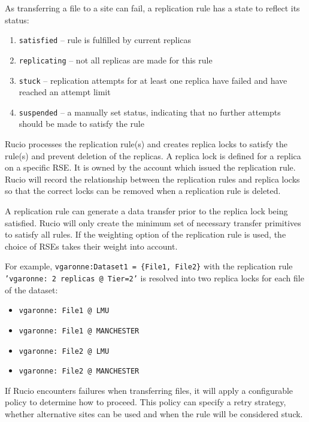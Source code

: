 \documentclass{atlasnote}
\begin{document}
As transferring a file to a site can fail, a replication rule has a state to reflect its status:

\begin{enumerate}
\item[] \texttt{satisfied} -- rule is fulfilled by current replicas
\item[] \texttt{replicating} -- not all replicas are made for this rule
\item[] \texttt{stuck} -- replication attempts for at least one replica have failed and have reached an attempt limit
\item[] \texttt{suspended} -- a manually set status, indicating that no further attempts should be made to satisfy the rule
\end{enumerate}

Rucio processes the replication rule(s) and creates replica locks to satisfy the rule(s) and prevent deletion of the replicas. A replica lock is defined for a replica on a specific RSE. It is owned by the account which issued the replication rule. Rucio will record the relationship between the replication rules and replica locks so that the correct locks can be removed when a replication rule is deleted.

A replication rule can generate a data transfer prior to the replica lock being satisfied. Rucio will only create the minimum set of necessary transfer primitives to satisfy all rules. If the weighting option of the replication rule is used, the choice of RSEs takes their weight into account.

For example, \texttt{vgaronne:Dataset1 = \{File1, File2\}} with the replication rule \texttt{'vgaronne: 2 replicas @ Tier=2'} is resolved into two replica locks for each file of the dataset:

\begin{itemize}
\item[] \texttt{vgaronne: File1 @ LMU}
\item[] \texttt{vgaronne: File1 @ MANCHESTER}
\item[] \texttt{vgaronne: File2 @ LMU}
\item[] \texttt{vgaronne: File2 @ MANCHESTER}
\end{itemize}

If Rucio encounters failures when transferring files, it will apply a configurable policy to determine how to proceed. This policy can specify a retry strategy, whether alternative sites can be used and when the rule will be considered stuck.
\end{document}

